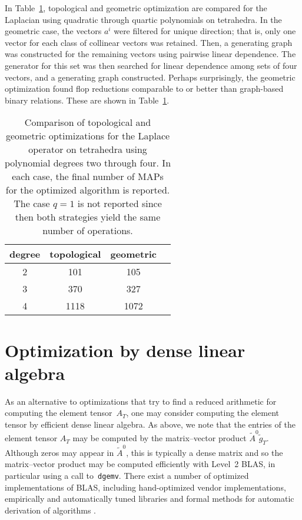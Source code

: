 In Table~\ref{tab:kirby-4:geom}, topological and geometric
optimization are compared for the Laplacian using quadratic through
quartic polynomials on tetrahedra. In the geometric case, the vectors
$a^i$ were filtered for unique direction; that is, only one vector for
each class of collinear vectors was retained. Then, a generating graph
was constructed for the remaining vectors using pairwise linear
dependence. The generator for this set was then searched for linear
dependence among sets of four vectors, and a generating graph
constructed. Perhaps surprisingly, the geometric optimization found
flop reductions comparable to or better than graph-based binary
relations. These are shown in Table~\ref{tab:kirby-4:geom}.

\begin{table}
  \center
    \begin{tabular}{|c|c|c|c|}
      \hline
      degree & topological & geometric \\
      \hline
      \hline
      2 & 101  & 105   \\
      \hline
      3 & 370  & 327   \\
      \hline
      4 & 1118 & 1072  \\
      \hline
    \end{tabular}
    \caption{Comparison of topological and geometric optimizations
      for the Laplace operator on tetrahedra using polynomial degrees two
      through four. In each case, the final number of MAPs for the
      optimized algorithm is reported. The case $q=1$ is not reported
      since then both strategies yield the same number of operations.}
  \label{tab:kirby-4:geom}
\end{table}

\section{Optimization by dense linear algebra}

As an alternative to optimizations that try to find a reduced arithmetic
for computing the element tensor~$A_T$, one may consider computing
the element tensor by efficient dense linear algebra. As above, we
note that the entries of the element tensor $A_T$ may be computed by
the matrix--vector product $\tilde{A}^0 \tilde{g}_T$. Although zeros
may appear in $\tilde{A}^0$, this is typically a dense matrix and so
the matrix--vector product may be computed efficiently with Level~2
BLAS, in particular using a call to~\texttt{dgemv}. There exist a
number of optimized implementations of BLAS, including hand-optimized
vendor implementations, empirically and automatically tuned libraries
\citep{WhaleyPetitetDongarra2001} and formal methods for automatic
derivation of algorithms \citet{BientinesiGunnelsMyersEtAl2005}.

